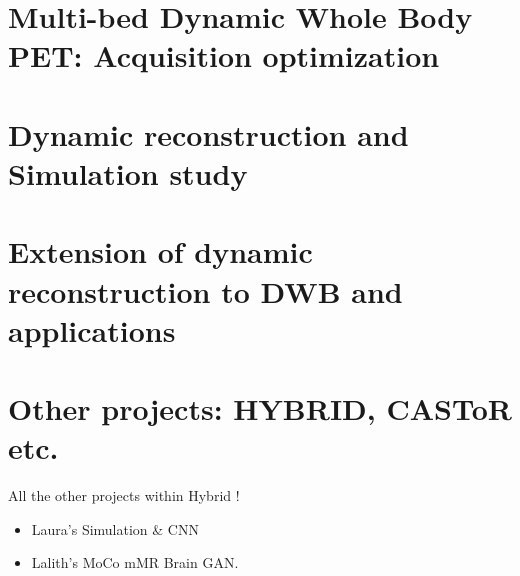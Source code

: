 

\chapter{Multi-bed Dynamic Whole Body PET: Acquisition optimization}


\chapter{Dynamic reconstruction and Simulation study}


\chapter{Extension of dynamic reconstruction to DWB and applications}


\chapter{Other projects: HYBRID, CASToR etc.}
All the other projects within Hybrid ! \\
\begin{itemize}
    \item Laura's Simulation \& CNN \\
    \item Lalith's MoCo mMR Brain GAN. \\
\end{itemize}

